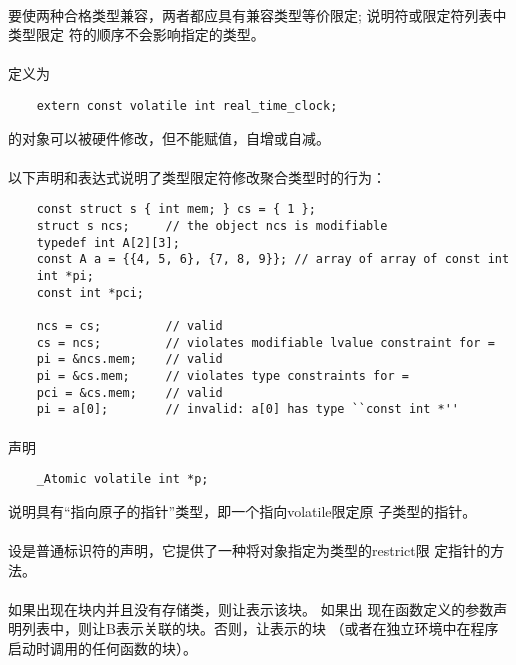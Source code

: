 \paragraph{}
要使两种合格类型兼容，两者都应具有兼容类型等价限定; 说明符或限定符列表中类型限定
符的顺序不会影响指定的类型。

\paragraph{}
\ex 定义为
\begin{lstlisting}
    extern const volatile int real_time_clock;
\end{lstlisting}
的对象可以被硬件修改，但不能赋值，自增或自减。

\paragraph{}
\ex 以下声明和表达式说明了类型限定符修改聚合类型时的行为：
\begin{lstlisting}
    const struct s { int mem; } cs = { 1 };
    struct s ncs;     // the object ncs is modifiable
    typedef int A[2][3];
    const A a = {{4, 5, 6}, {7, 8, 9}}; // array of array of const int
    int *pi;
    const int *pci;

    ncs = cs;         // valid
    cs = ncs;         // violates modifiable lvalue constraint for =
    pi = &ncs.mem;    // valid
    pi = &cs.mem;     // violates type constraints for =
    pci = &cs.mem;    // valid
    pi = a[0];        // invalid: a[0] has type ``const int *''
\end{lstlisting}

\paragraph{}
\ex 声明
\begin{lstlisting}
    _Atomic volatile int *p;
\end{lstlisting}
说明具有``指向原子的指针''类型，即一个指向volatile限定原
子类型的指针。

\paragraph{}
设是普通标识符的声明，它提供了一种将对象指定为类型的restrict限
定指针的方法。

\paragraph{}
如果出现在块内并且没有存储类，则让表示该块。 如果出
现在函数定义的参数声明列表中，则让B表示关联的块。否则，让表示的块
（或者在独立环境中在程序启动时调用的任何函数的块）。


